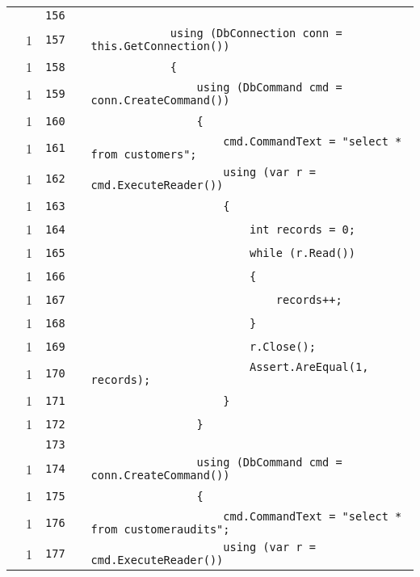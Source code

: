\documentclass[a4paper,10pt]{article}
\begin{document}
\begin{longtable}[l]{lrrll}
\cellcolor{gray} &  & \verb~156~ & & \verb~~\\
\cellcolor{green} & 1 & \verb~157~ & & \verb~            using (DbConnection conn = this.GetConnection())~\\
\cellcolor{green} & 1 & \verb~158~ & & \verb~            {~\\
\cellcolor{green} & 1 & \verb~159~ & & \verb~                using (DbCommand cmd = conn.CreateCommand())~\\
\cellcolor{green} & 1 & \verb~160~ & & \verb~                {~\\
\cellcolor{green} & 1 & \verb~161~ & & \verb~                    cmd.CommandText = "select * from customers";~\\
\cellcolor{green} & 1 & \verb~162~ & & \verb~                    using (var r = cmd.ExecuteReader())~\\
\cellcolor{green} & 1 & \verb~163~ & & \verb~                    {~\\
\cellcolor{green} & 1 & \verb~164~ & & \verb~                        int records = 0;~\\
\cellcolor{green} & 1 & \verb~165~ & & \verb~                        while (r.Read())~\\
\cellcolor{green} & 1 & \verb~166~ & & \verb~                        {~\\
\cellcolor{green} & 1 & \verb~167~ & & \verb~                            records++;~\\
\cellcolor{green} & 1 & \verb~168~ & & \verb~                        }~\\
\cellcolor{green} & 1 & \verb~169~ & & \verb~                        r.Close();~\\
\cellcolor{green} & 1 & \verb~170~ & & \verb~                        Assert.AreEqual(1, records);~\\
\cellcolor{green} & 1 & \verb~171~ & & \verb~                    }~\\
\cellcolor{green} & 1 & \verb~172~ & & \verb~                }~\\
\cellcolor{gray} &  & \verb~173~ & & \verb~~\\
\cellcolor{green} & 1 & \verb~174~ & & \verb~                using (DbCommand cmd = conn.CreateCommand())~\\
\cellcolor{green} & 1 & \verb~175~ & & \verb~                {~\\
\cellcolor{green} & 1 & \verb~176~ & & \verb~                    cmd.CommandText = "select * from customeraudits";~\\
\cellcolor{green} & 1 & \verb~177~ & & \verb~                    using (var r = cmd.ExecuteReader())~\\

\end{longtable}
\end{document}
